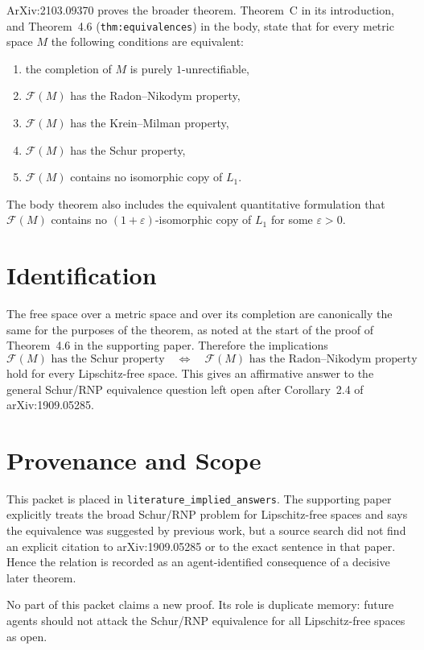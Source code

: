 \documentclass[11pt]{article}
\newcommand{\Free}{\mathcal{F}}
\begin{document}
ArXiv:2103.09370 proves the broader theorem.  Theorem~C in its introduction,
and Theorem~4.6 (\texttt{thm:equivalences}) in the body, state that for every
metric space \(M\) the following conditions are equivalent:
\begin{enumerate}[leftmargin=*]
\item the completion of \(M\) is purely \(1\)-unrectifiable,
\item \(\Free(M)\) has the Radon--Nikodym property,
\item \(\Free(M)\) has the Krein--Milman property,
\item \(\Free(M)\) has the Schur property,
\item \(\Free(M)\) contains no isomorphic copy of \(L_1\).
\end{enumerate}
The body theorem also includes the equivalent quantitative formulation that
\(\Free(M)\) contains no \((1+\varepsilon)\)-isomorphic copy of \(L_1\) for
some \(\varepsilon>0\).

\section{Identification}

The free space over a metric space and over its completion are canonically the
same for the purposes of the theorem, as noted at the start of the proof of
Theorem~4.6 in the supporting paper.  Therefore the implications
\[
  \Free(M)\text{ has the Schur property}
  \quad\Longleftrightarrow\quad
  \Free(M)\text{ has the Radon--Nikodym property}
\]
hold for every Lipschitz-free space.  This gives an affirmative answer to the
general Schur/RNP equivalence question left open after Corollary~2.4 of
arXiv:1909.05285.

\section{Provenance and Scope}

This packet is placed in \texttt{literature\_implied\_answers}.  The
supporting paper explicitly treats the broad Schur/RNP problem for
Lipschitz-free spaces and says the equivalence was suggested by previous
work, but a source search did not find an explicit citation to arXiv:1909.05285
or to the exact sentence in that paper.  Hence the relation is recorded as an
agent-identified consequence of a decisive later theorem.

No part of this packet claims a new proof.  Its role is duplicate memory:
future agents should not attack the Schur/RNP equivalence for all
Lipschitz-free spaces as open.
\end{document}
